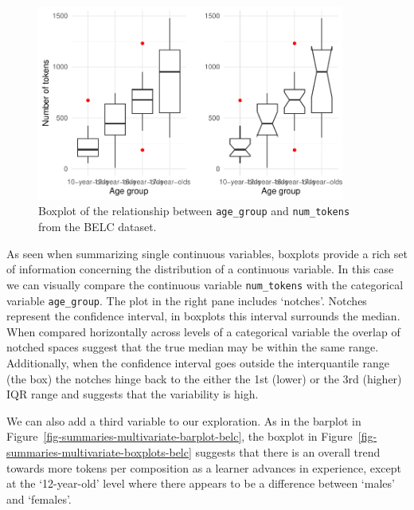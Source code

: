 \documentclass[
  letterpaper,
]{latex/krantz}
\begin{document}
\begin{figure}[h]

{\centering \includegraphics[width=0.9\textwidth,height=\textheight]{./approaching-analysis_files/figure-pdf/fig-summaries-bivariate-boxplots-belc-1.pdf}

}

\caption{\label{fig-summaries-bivariate-boxplots-belc}Boxplot of the
relationship between \texttt{age\_group} and \texttt{num\_tokens} from
the BELC dataset.}

\end{figure}

As seen when summarizing single continuous variables, boxplots provide a
rich set of information concerning the distribution of a continuous
variable. In this case we can visually compare the continuous variable
\texttt{num\_tokens} with the categorical variable \texttt{age\_group}.
The plot in the right pane includes `notches'. Notches represent the
confidence interval, in boxplots this interval surrounds the median.
When compared horizontally across levels of a categorical variable the
overlap of notched spaces suggest that the true median may be within the
same range. Additionally, when the confidence interval goes outside the
interquantile range (the box) the notches hinge back to the either the
1st (lower) or the 3rd (higher) IQR range and suggests that the
variability is high.

We can also add a third variable to our exploration. As in the barplot
in Figure~\ref{fig-summaries-multivariate-barplot-belc}, the boxplot in
Figure~\ref{fig-summaries-multivariate-boxplots-belc} suggests that
there is an overall trend towards more tokens per composition as a
learner advances in experience, except at the `12-year-old' level where
there appears to be a difference between `males' and `females'.
\end{document}
